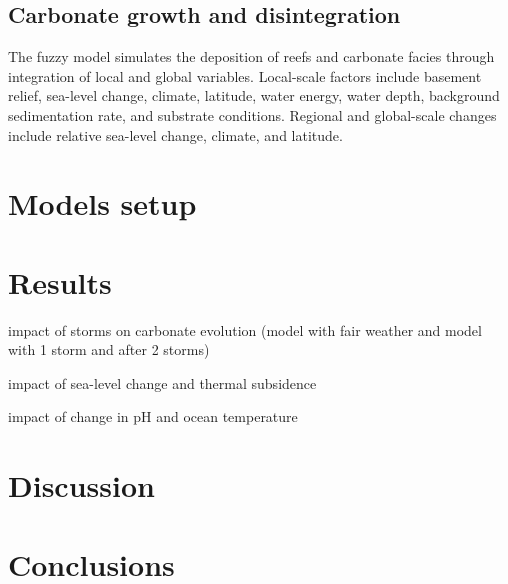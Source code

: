 \documentclass[default,jgrga]{agutex2015}
\begin{document}
\begin{article}
\subsection{Carbonate growth and disintegration}

The fuzzy model simulates the deposition of reefs and carbonate facies through integration of local and global variables. Local-scale factors include basement relief, sea-level change, climate, latitude, water energy, water depth, background sedimentation rate, and substrate conditions. Regional and global-scale changes include relative sea-level change, climate, and latitude.

\section{Models setup}


\section{Results}

impact of storms on carbonate evolution (model with fair weather and model with 1 storm and after 2 storms)

impact of sea-level change and thermal subsidence 

impact of change in pH and ocean temperature

\section{Discussion}


\section{Conclusions}



\end{article}
\end{document}
